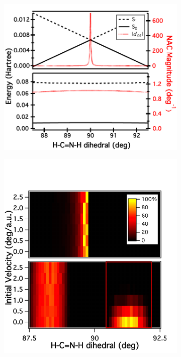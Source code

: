 \documentclass[12pt]{article}
\begin{document}
\begin{figure}[h!]
  \centering
  \vspace{-0.5cm}
  \begin{subfigure}[b]{0.40\textwidth}
  \includegraphics[width=\textwidth]{gs_es_dercp} 
  \caption{ }
  \label{fig:gs_es_dercp}
  \end{subfigure}
  \begin{subfigure}[b]{0.40\textwidth}
  \includegraphics[width=\textwidth]{stacked_hops} 

\end{subfigure}
\end{figure}
\end{document}
